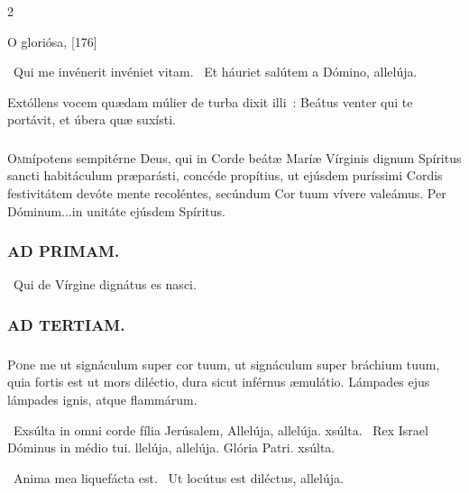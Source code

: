 \documentclass[9pt,twoside]{extarticle}
\begin{document}
\begin{multicols}{2}
\begin{tightlist}{}
\item {} O gloriósa,  [176]
\item {}~Qui me invénerit invéniet vitam. ~Et háuriet salútem a Dómino, allelúja.
\item {} Extóllens vocem quædam múlier de turba dixit illi~: Beátus venter qui te portávit, et úbera quæ suxísti.
\end{tightlist}

\subsubsection*{\center {}}
\lettrine{O}mnípotens sempitérne Deus, qui in Corde beátæ Maríæ Vírginis dignum Spíritus sancti habitáculum præparásti, concéde propítius, ut ejúsdem puríssimi Cordis festivitátem devóte mente recoléntes, secúndum Cor tuum vívere valeámus. Per Dóminum...in unitáte ejúsdem Spíritus.

\begin{tightlist}{}
\item {}
\end{tightlist}

\subsubsection*{\center \textsc{AD PRIMAM.}}
\begin{tightlist}{}
\item {}~Qui de Vírgine dignátus es nasci.
\end{tightlist}

\subsubsection*{\center \textsc{AD TERTIAM.}}
\subsubsection*{}
\lettrine{P}one me ut signáculum super cor tuum, ut signáculum super bráchium tuum, quia fortis est ut mors diléctio, dura sicut inférnus æmulátio. Lámpades ejus lámpades ignis, atque flammárum.

\begin{tightlist}{}
\item {}~Exsúlta in omni corde fília Jerúsalem, \textred{*} Allelúja, allelúja. xsúlta.
~Rex Israel Dóminus in médio tui. llelúja, allelúja.
Glória Patri. xsúlta.
\item {}~Anima mea liquefácta est. ~Ut locútus est diléctus, allelúja.
\end{tightlist}



\end{multicols}
\end{document}
